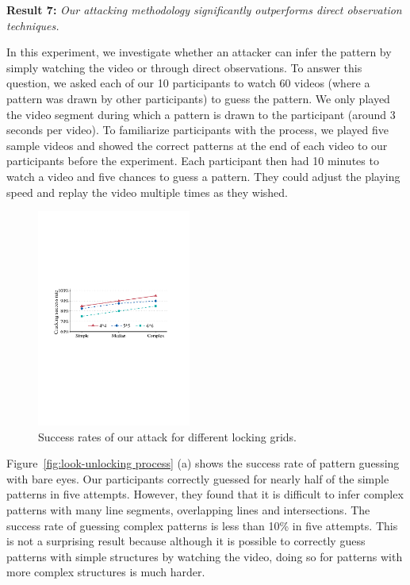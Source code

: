     \noindent \textbf{Result 7:} \emph{Our attacking methodology significantly outperforms direct observation techniques.}

   In this experiment, we investigate whether an attacker can infer the pattern by
   simply watching the video or through direct observations. To answer this question, we asked each of our 10 participants to watch 60 videos (where
   a pattern was drawn by other participants) to guess the pattern.  We
    only played the video segment during which a pattern is drawn to the participant (around 3 seconds per video).
   To familiarize participants with the process, we
    played  five sample videos and showed the correct patterns at the end of each video to our participants before the experiment.
   Each participant then had 10 minutes to watch a video and five chances to guess a pattern. They could adjust the playing speed and
   replay the video multiple times as they wished.

        \begin{figure}[!t]
            \centering
            \includegraphics[width=0.45\textwidth]{fig/scalability.pdf}
            \caption{Success rates of our attack for different locking grids.}
            \label{fig:scalability}
        \end{figure}

        Figure~\ref{fig:look-unlocking process} (a) shows the success rate of pattern guessing with
        bare eyes. Our participants correctly guessed for nearly half of the
        simple patterns in five attempts. However, they found that it is difficult
        to infer complex patterns with many line segments, overlapping lines and intersections.
        The success rate of guessing complex patterns is less than 10\% in five attempts.
        This is not a surprising result
        because although it is possible to correctly guess patterns with
        simple structures by watching the video, doing so for patterns with
        more complex structures is much harder.


